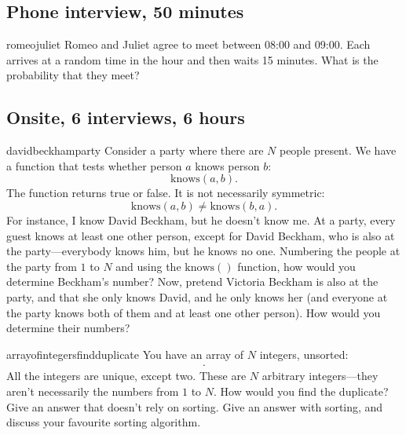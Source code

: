 \documentclass[a4paper]{article}
\begin{document}
\clearpage









\clearpage
\subsection{Phone interview,  50 minutes}
\begin{question}{romeojuliet}
Romeo and Juliet agree to meet between 08:00 and 09:00.
Each arrives at a random time in the hour and then waits 15 minutes.
What is the probability that they meet?
\end{question}

\clearpage



\clearpage
\subsection{Onsite, 6 interviews, 6 hours}
\begin{question}{davidbeckhamparty}
Consider a party where there are $N$ people present.
We have a function that tests whether person $a$ knows person $b$:
\[
  \text{knows}(a, b)
  \text{.}
\]
The function returns true or false.
It is not necessarily symmetric:
\[
  \text{knows}(a, b) \neq \text{knows}(b, a)
  \text{.}
\]
For instance, I know David Beckham, but he doesn't know me.
At a party, every guest knows at least one other person, except for David Beckham, who is also at the party---everybody knows him, but he knows no one.
Numbering the people at the party from $1$ to $N$ and using the
$\text{knows}()$
function, how would you determine Beckham's number?
Now, pretend Victoria Beckham is also at the party, and that she only knows David, and he only knows her (and everyone at the party knows both of them and at least one other person).
How would you determine their numbers?
\end{question}



\begin{question}{arrayofintegersfindduplicate}
You have an array of $N$ integers, unsorted:
\begin{align*}
  [n_1, n_2, \ldots , n_{N} ]
  \text{.}
\end{align*}
All the integers are unique, except two.
These are $N$ arbitrary integers---they aren't necessarily the numbers from $1$ to $N$.
How would you find the duplicate?
Give an answer that doesn't rely on sorting.
Give an answer with sorting, and discuss your favourite sorting algorithm.
\end{question}
\end{document}
